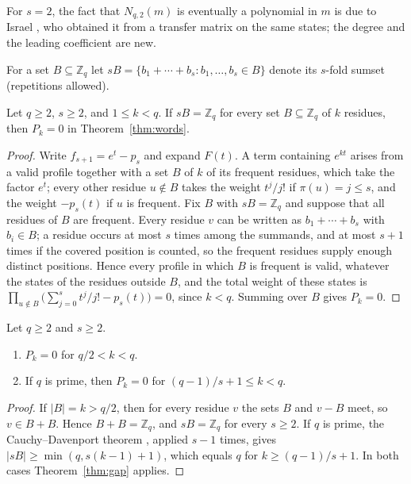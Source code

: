 \documentclass[12pt,reqno]{article}
\newcommand{\Zq}{\mathbb{Z}_q}
\begin{document}
For $s = 2$, the fact that $N_{q,2}(m)$ is eventually a polynomial in $m$ is
due to Israel \cite{israel}, who obtained it from a transfer matrix on the
same states; the degree and the leading coefficient are new.

For a set $B \subseteq \Zq$ let
$sB = \{b_1 + \cdots + b_s : b_1, \ldots, b_s \in B\}$ denote its $s$-fold
sumset (repetitions allowed).

\begin{theorem}\label{thm:gap}
Let $q \ge 2$, $s \ge 2$, and $1 \le k < q$. If $sB = \Zq$ for every set
$B \subseteq \Zq$ of $k$ residues, then $P_k = 0$ in Theorem~\ref{thm:words}.
\end{theorem}

\begin{proof}
Write $f_{s+1} = e^t - p_s$ and expand $F(t)$. A term containing $e^{kt}$
arises from a valid profile together with a set $B$ of $k$ of its frequent
residues, which take the factor $e^t$; every other residue $u \notin B$ takes
the weight $t^j/j!$ if $\pi(u) = j \le s$, and the weight $-p_s(t)$ if $u$ is
frequent. Fix $B$ with $sB = \Zq$ and suppose that all residues of $B$ are
frequent. Every residue $v$ can be written as $b_1 + \cdots + b_s$ with
$b_i \in B$; a residue occurs at most $s$ times among the summands, and at most
$s+1$ times if the covered position is counted, so the frequent residues
supply enough distinct positions. Hence every profile in which $B$ is frequent
is valid, whatever the states of the residues outside $B$, and the total
weight of these states is
$\prod_{u \notin B} \bigl(\sum_{j=0}^{s} t^j/j! - p_s(t)\bigr) = 0$, since
$k < q$. Summing over $B$ gives $P_k = 0$.
\end{proof}

\begin{corollary}\label{cor:gap}
Let $q \ge 2$ and $s \ge 2$.
\begin{enumerate}
\item $P_k = 0$ for $q/2 < k < q$.
\item If $q$ is prime, then $P_k = 0$ for $(q-1)/s + 1 \le k < q$.
\end{enumerate}
\end{corollary}

\begin{proof}
If $|B| = k > q/2$, then for every residue $v$ the sets $B$ and $v - B$ meet,
so $v \in B + B$. Hence $B + B = \Zq$, and $sB = \Zq$ for every $s \ge 2$. If $q$
is prime, the Cauchy--Davenport theorem \cite{dav}, applied $s - 1$ times, gives
$|sB| \ge \min(q, s(k-1)+1)$, which equals $q$ for $k \ge (q-1)/s + 1$. In both
cases Theorem~\ref{thm:gap} applies.
\end{proof}
\end{document}
